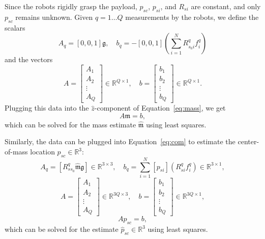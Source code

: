 \documentclass[letterpaper, 10 pt, journal, twoside]{IEEEtran}
\newcommand{\real}{\mathbb{R}}
\newcommand{\mass}{{\mathfrak{m}}}
\newcommand{\grav}{{\mathfrak{g}}}
\begin{document}
Since the robots rigidly grasp the payload, $p_{sc}$, $p_{si}$, and $R_{si}$ are constant, and only $p_{sc}$ remains unknown. Given $q = 1 \ldots Q$ measurements by the robots, we define the scalars 
\begin{equation}
A_q = [0,0,1] \grav, \quad
b_q = - [0,0,1] \left(\sum_{i=1}^{N} R_{s_0i}^q f_i^q\right) 
\end{equation}
and the vectors
\begin{equation}
    A = \begin{bmatrix}
        A_1 \\
        A_2 \\
        \vdots \\
        A_Q
    \end{bmatrix} \in \mathbb{R}^{Q \times 1}, \quad
    b = \begin{bmatrix}
        b_1 \\
        b_2 \\
        \vdots \\
        b_Q
    \end{bmatrix} \in \mathbb{R}^{Q \times 1}.
\end{equation}
Plugging this data into the $\hat{z}$-component of Equation~\eqref{eq:mass}, we get
\begin{equation}
A\mass = b,
\end{equation}
which can be solved for the mass estimate $\hat{\mass}$ using least squares.

Similarly, the data can be plugged into Equation~\eqref{eq:com} to estimate the center-of-mass location $p_{sc} \in \real^3$: 
\begin{equation}
A_q = [{R_{ss_0}^q}  \hat{\mass} \grav] \in \real^{3 \times 3}, \quad
b_q = \sum_{i=1}^{N} [p_{si}] (R_{si}^q f_i^q) \in \real^{3 \times 1},
\end{equation}
\begin{equation}
    A = \begin{bmatrix}
        A_1 \\
        A_2 \\
        \vdots \\
        A_Q
    \end{bmatrix} \in \mathbb{R}^{3Q \times 3}, \quad
    b = \begin{bmatrix}
        b_1 \\
        b_2 \\
        \vdots \\
        b_Q
    \end{bmatrix} \in \mathbb{R}^{3Q \times 1},
\end{equation}
\begin{equation}
Ap_{sc} = b,
\end{equation}
which can be solved for the estimate $\hat{p}_{sc} \in \real^3$ using least squares.
\end{document}
